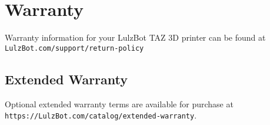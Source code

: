 %
%
%
%
%

\section{Warranty}
Warranty information for your LulzBot\textsuperscript{\miniscule{\texttrademark}} TAZ 3D printer can be found at \texttt{LulzBot.com/support/return-policy}

\subsection{Extended Warranty}
Optional extended warranty terms are available for purchase at \texttt{https://LulzBot.com/catalog/extended-warranty}.
